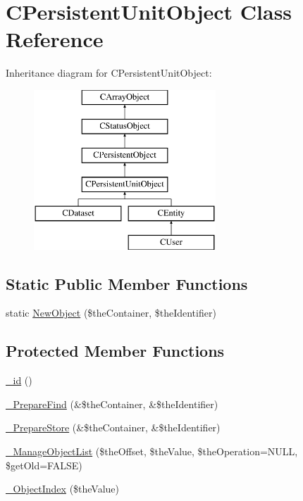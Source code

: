 \hypertarget{class_c_persistent_unit_object}{\section{C\-Persistent\-Unit\-Object Class Reference}
\label{class_c_persistent_unit_object}
}
Inheritance diagram for C\-Persistent\-Unit\-Object\-:\begin{figure}[H]
\begin{center}
\leavevmode
\includegraphics[height=6.000000cm]{class_c_persistent_unit_object}
\end{center}
\end{figure}
\subsection*{Static Public Member Functions}
\begin{DoxyCompactItemize}
\item 
static \hyperlink{class_c_persistent_unit_object_a1907cae8109d56e91e675cbcbb299c44}{New\-Object} (\$the\-Container, \$the\-Identifier)
\end{DoxyCompactItemize}
\subsection*{Protected Member Functions}
\begin{DoxyCompactItemize}
\item 
\hyperlink{class_c_persistent_unit_object_ad1ca0920cf0df3c24351402f9afbf34b}{\-\_\-id} ()
\item 
\hyperlink{class_c_persistent_unit_object_a68e0b572ee840cd8d8db4e1bb499c89f}{\-\_\-\-Prepare\-Find} (\&\$the\-Container, \&\$the\-Identifier)
\item 
\hyperlink{class_c_persistent_unit_object_a42b46ccb307aa8038e5ed78819a23aa6}{\-\_\-\-Prepare\-Store} (\&\$the\-Container, \&\$the\-Identifier)
\item 
\hyperlink{class_c_persistent_unit_object_a9a011ae9563597aa97fd5886481171d7}{\-\_\-\-Manage\-Object\-List} (\$the\-Offset, \$the\-Value, \$the\-Operation=N\-U\-L\-L, \$get\-Old=F\-A\-L\-S\-E)
\item 
\hyperlink{class_c_persistent_unit_object_af3280ba46d1570a0864a8b31801e98fb}{\-\_\-\-Object\-Index} (\$the\-Value)
\end{DoxyCompactItemize}


